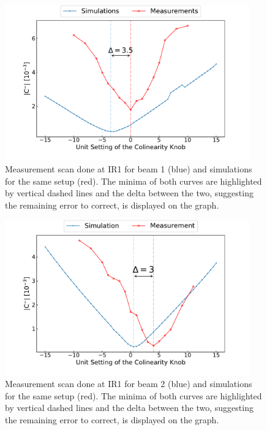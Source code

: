 \begin{figure}[!htb]
    \centering
    \includegraphics*[width=0.94\textwidth]{Figures/IR_Coupling_Correction/rws_measurement_ir1_b1_pos.pdf}
    \caption{Measurement scan done at IR\num{1} for beam \num{1} (\textcolor{mplblue}{blue}) and simulations for the same setup (\textcolor{mplr}{red}). The minima of both curves are highlighted by vertical dashed lines and the delta between the two, suggesting the remaining error to correct, is displayed on the graph.}
    \label{figure:ir1_b1_pos_measurement}
\end{figure}

\begin{figure}[!htb]
    \centering
    \includegraphics*[width=0.94\textwidth]{Figures/IR_Coupling_Correction/rws_measurement_ir1_b2_pos.pdf}
    \caption{Measurement scan done at IR\num{1} for beam \num{2} (\textcolor{mplblue}{blue}) and simulations for the same setup (\textcolor{mplr}{red}). The minima of both curves are highlighted by vertical dashed lines and the delta between the two, suggesting the remaining error to correct, is displayed on the graph.}
    \label{figure:ir1_b2_pos_measurement}
\end{figure}

